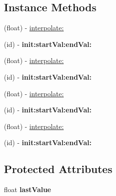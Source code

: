 \subsection*{Instance Methods}
\begin{DoxyCompactItemize}
\item 
(float) -\/ \hyperlink{interfaceCDFloatInterpolator_a0eff31af0006d4602c728fc6fbd7e755}{interpolate\+:}
\item 
\mbox{\label{interfaceCDFloatInterpolator_ad8d76c98971c927988ae79fce7209dd0}} 
(id) -\/ {\bfseries init\+:start\+Val\+:end\+Val\+:}
\item 
(float) -\/ \hyperlink{interfaceCDFloatInterpolator_a0eff31af0006d4602c728fc6fbd7e755}{interpolate\+:}
\item 
\mbox{\label{interfaceCDFloatInterpolator_ad8d76c98971c927988ae79fce7209dd0}} 
(id) -\/ {\bfseries init\+:start\+Val\+:end\+Val\+:}
\item 
(float) -\/ \hyperlink{interfaceCDFloatInterpolator_a0eff31af0006d4602c728fc6fbd7e755}{interpolate\+:}
\item 
\mbox{\label{interfaceCDFloatInterpolator_ad8d76c98971c927988ae79fce7209dd0}} 
(id) -\/ {\bfseries init\+:start\+Val\+:end\+Val\+:}
\item 
(float) -\/ \hyperlink{interfaceCDFloatInterpolator_a0eff31af0006d4602c728fc6fbd7e755}{interpolate\+:}
\item 
\mbox{\label{interfaceCDFloatInterpolator_ad8d76c98971c927988ae79fce7209dd0}} 
(id) -\/ {\bfseries init\+:start\+Val\+:end\+Val\+:}
\end{DoxyCompactItemize}
\subsection*{Protected Attributes}
\begin{DoxyCompactItemize}
\item 
\mbox{\label{interfaceCDFloatInterpolator_aef38c90b94696fcdd93a0e399c04a3a7}} 
float {\bfseries last\+Value}
\end{DoxyCompactItemize}
